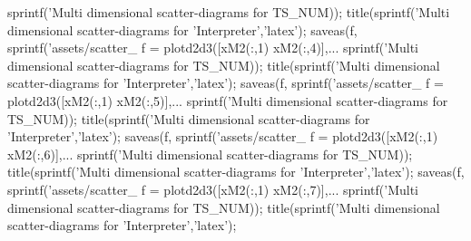 \documentclass[11pt,]{article}
\newenvironment{Shaded}{}{}
\newcommand{\FloatTok}[1]{\textcolor[rgb]{0.25,0.63,0.44}{#1}}
\newcommand{\NormalTok}[1]{#1}
\newcommand{\StringTok}[1]{\textcolor[rgb]{0.25,0.44,0.63}{#1}}
\begin{document}
\begin{Shaded}
\begin{Highlighting}[]
{{{{{{{{{{{{{\NormalTok{              sprintf(}\StringTok{'Multi dimensional scatter-diagrams for %
\NormalTok{              TS_NUM));}
\NormalTok{  title(sprintf(}\StringTok{'Multi dimensional scatter-diagrams for %
        \StringTok{'Interpreter'}\NormalTok{,}\StringTok{'latex'}\NormalTok{);}
\NormalTok{  saveas(f, sprintf(}\StringTok{'assets/scatter_%
\NormalTok{  f = plotd2d3([xM2(:,}\FloatTok{1}\NormalTok{) xM2(:,}\FloatTok{4}\NormalTok{)],...}
\NormalTok{              sprintf(}\StringTok{'Multi dimensional scatter-diagrams for %
\NormalTok{              TS_NUM));}
\NormalTok{  title(sprintf(}\StringTok{'Multi dimensional scatter-diagrams for %
        \StringTok{'Interpreter'}\NormalTok{,}\StringTok{'latex'}\NormalTok{);}
\NormalTok{  saveas(f, sprintf(}\StringTok{'assets/scatter_%
\NormalTok{  f = plotd2d3([xM2(:,}\FloatTok{1}\NormalTok{) xM2(:,}\FloatTok{5}\NormalTok{)],...}
\NormalTok{              sprintf(}\StringTok{'Multi dimensional scatter-diagrams for %
\NormalTok{              TS_NUM));}
\NormalTok{  title(sprintf(}\StringTok{'Multi dimensional scatter-diagrams for %
        \StringTok{'Interpreter'}\NormalTok{,}\StringTok{'latex'}\NormalTok{);}
\NormalTok{  saveas(f, sprintf(}\StringTok{'assets/scatter_%
\NormalTok{  f = plotd2d3([xM2(:,}\FloatTok{1}\NormalTok{) xM2(:,}\FloatTok{6}\NormalTok{)],...}
\NormalTok{              sprintf(}\StringTok{'Multi dimensional scatter-diagrams for %
\NormalTok{              TS_NUM));}
\NormalTok{  title(sprintf(}\StringTok{'Multi dimensional scatter-diagrams for %
        \StringTok{'Interpreter'}\NormalTok{,}\StringTok{'latex'}\NormalTok{);}
\NormalTok{  saveas(f, sprintf(}\StringTok{'assets/scatter_%
\NormalTok{  f = plotd2d3([xM2(:,}\FloatTok{1}\NormalTok{) xM2(:,}\FloatTok{7}\NormalTok{)],...}
\NormalTok{              sprintf(}\StringTok{'Multi dimensional scatter-diagrams for %
\NormalTok{              TS_NUM));}
\NormalTok{  title(sprintf(}\StringTok{'Multi dimensional scatter-diagrams for %
        \StringTok{'Interpreter'}\NormalTok{,}\StringTok{'latex'}\NormalTok{);}
}}}}}}}}}}}}}}}}}}}}}}}}}}}
\end{Highlighting}
\end{Shaded}
\end{document}
